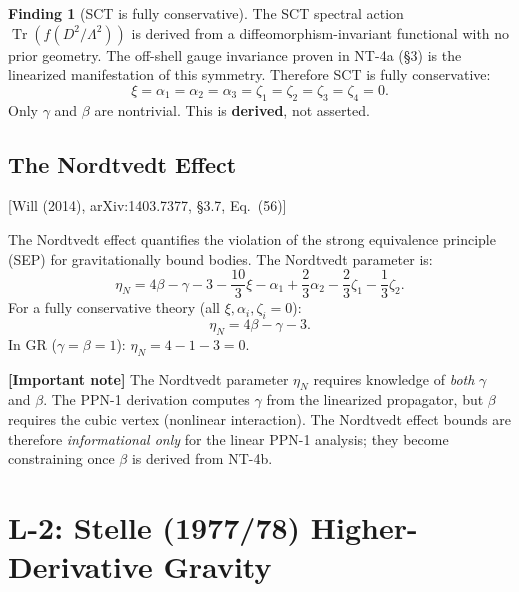 \documentclass[11pt,a4paper]{article}
\theoremstyle{plain}
\theoremstyle{definition}
\newtheorem{finding}[theorem]{Finding}
\theoremstyle{remark}
\newcommand{\Tr}{\operatorname{Tr}}
\newcommand{\fromlit}[1]{\textcolor{sctblue}{\textsf{[#1]}}}
\newcommand{\signcorrection}[1]{%
  \par\smallskip\noindent
  \colorbox{red!10}{\parbox{\dimexpr\linewidth-2\fboxsep}{%
    \textcolor{red!60!black}{\textbf{[Important note]}} #1}}%
  \par\smallskip}
\begin{document}
\begin{finding}[SCT is fully conservative]\label{find:sct-conservative}
The SCT spectral action $\Tr(f(D^2/\Lambda^2))$ is derived from
a diffeomorphism-invariant functional with no prior geometry.
The off-shell gauge invariance proven in NT-4a (\S3) is the
linearized manifestation of this symmetry.  Therefore SCT is fully
conservative:
\begin{equation}\label{eq:sct-conservative}
  \xi = \alpha_1 = \alpha_2 = \alpha_3
  = \zeta_1 = \zeta_2 = \zeta_3 = \zeta_4 = 0.
\end{equation}
Only $\gamma$ and $\beta$ are nontrivial.  This is \textbf{derived},
not asserted.
\end{finding}

\subsection{The Nordtvedt Effect}

\fromlit{Will (2014), arXiv:1403.7377, \S3.7, Eq.~(56)}

The Nordtvedt effect quantifies the violation of the strong
equivalence principle (SEP) for gravitationally bound bodies.
The Nordtvedt parameter is:
\begin{equation}\label{eq:nordtvedt}
  \eta_N = 4\beta - \gamma - 3
    - \frac{10}{3}\xi - \alpha_1
    + \frac{2}{3}\alpha_2 - \frac{2}{3}\zeta_1
    - \frac{1}{3}\zeta_2.
\end{equation}
For a fully conservative theory (all $\xi, \alpha_i, \zeta_i = 0$):
\begin{equation}\label{eq:nordtvedt-simple}
  \eta_N = 4\beta - \gamma - 3.
\end{equation}
In GR ($\gamma = \beta = 1$): $\eta_N = 4 - 1 - 3 = 0$.

\signcorrection{The Nordtvedt parameter $\eta_N$ requires
knowledge of \emph{both} $\gamma$ and $\beta$.  The PPN-1
derivation computes $\gamma$ from the linearized propagator,
but $\beta$ requires the cubic vertex (nonlinear interaction).
The Nordtvedt effect bounds are therefore \emph{informational
only} for the linear PPN-1 analysis; they become constraining
once $\beta$ is derived from NT-4b.}


\section{L-2: Stelle (1977/78) Higher-Derivative Gravity}
\label{sec:stelle}
\end{document}
